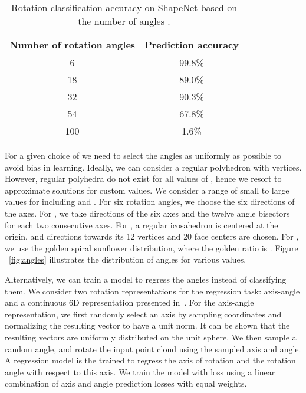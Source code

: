 \documentclass[10pt,twocolumn,letterpaper]{article}
\begin{document}
\begin{table}
\begin{center}
\begin{tabular}{|c|c|}
\hline
Number of rotation angles  & Prediction accuracy \\
\hline\hline
6 & 99.8\% \\
18 & 89.0\% \\
32 & 90.3\% \\
54 & 67.8\% \\
100 & 1.6\% \\
\hline
\end{tabular}
\end{center}
\caption{Rotation classification accuracy on ShapeNet based on the number of angles .}\label{tab:rot accuracy shapenet}
\end{table}

For a given choice of  we need to select the angles as uniformly as possible to avoid bias in learning. Ideally, we can consider a regular polyhedron with  vertices. However, regular polyhedra do not exist for all values of , hence we resort to approximate solutions for custom  values. 
We consider a range of small to large values for  including  and .  
For six rotation angles, we choose the six directions of the  axes. 
For , we take directions of the six axes and the twelve angle bisectors for each two consecutive axes. 
For , a regular icosahedron is centered at the origin, and directions towards its 12 vertices and 20 face centers are chosen.
For , we use the golden spiral sunflower distribution, where the golden ratio is . Figure ~\ref{fig:angles} illustrates the distribution of angles for various  values. 

Alternatively, we can train a model to regress the angles instead of classifying them. We consider two rotation representations for the regression task: axis-angle and a continuous 6D representation presented in~\cite{zhou2019continuity}.  
For the axis-angle representation, we first randomly select an axis by sampling coordinates  and normalizing the resulting vector  to have a unit norm. It can be shown that the resulting vectors are uniformly distributed on the unit sphere. We then sample a random angle, and rotate the input point cloud using the sampled axis and angle. A regression model is the trained to regress the axis of rotation and the rotation angle with respect to this axis. 
We train the model with  loss using a linear combination of axis and angle prediction losses with equal weights. 
\end{document}
